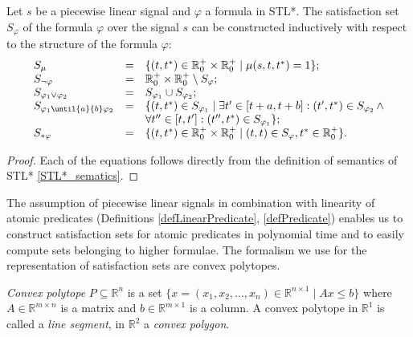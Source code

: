 \begin{theorem}
	\label{monitoring_STL*}
	Let $s$ be a piecewise linear signal and $\varphi$ a formula in STL*. The satisfaction set $S_\varphi$ of the formula $\varphi$ over the signal $s$ can be constructed inductively with respect to the structure of the formula $\varphi$:       
	\begin{equation*}
    	\begin{array}{lcl}
        	S_\mu & = & \lbrace (t, t^\ast) \in \mathbb{R}_0^+ \times \mathbb{R}_0^+ \mid \mu(s, t, t^\ast) = 1 \rbrace;\\
    		S_{\neg \varphi} & = & \mathbb{R}_0^+ \times \mathbb{R}_0^+ \setminus S_\varphi;\\ 
    		S_{\varphi_1 \vee \varphi_2} & = & S_{\varphi_1} \cup S_{\varphi_2};\\
			S_{\varphi_1 \until{a}{b} \varphi_2} & = & \lbrace (t, t^\ast) \in S_{\varphi_1} \mid \exists t' \in [t + a, t + b]: (t', t^\ast) \in S_{\varphi_2} \, \wedge\\
			& & \forall t'' \in [t, t'] : (t'', t^\ast) \in S_{\varphi_1}\rbrace;\\
			S_{\ast \varphi} & = & \lbrace (t, t^\ast) \in \mathbb{R}_0^+ \times \mathbb{R}_0^+ \mid (t, t) \in S_{\varphi}, t^\ast \in \mathbb{R}_0^+ \rbrace.\\ 
		\end{array}
	\end{equation*}

	\begin{proof}
		Each of the equations follows directly from the definition of semantics of STL* \eqref{STL*_sematics}.
	\end{proof}
\end{theorem}

The assumption of piecewise linear signals in combination with linearity of atomic predicates (Definitions \ref{defLinearPredicate}, \ref{defPredicate}) enables us to construct satisfaction sets for atomic predicates in polynomial time and to easily compute sets belonging to higher formulae. The formalism we use for the representation of satisfaction sets are convex polytopes.

\begin{definition}
	\label{defConvexPolytope}
	\emph{Convex polytope} $P \subseteq \mathbb{R}^n$ is a set $\lbrace x = (x_1, x_2, \ldots, x_n) \in \mathbb{R}^{n \times 1} \mid Ax \leq b \rbrace$ where $A \in \mathbb{R}^{m \times n}$ is a matrix and $b \in \mathbb{R}^{m \times 1}$ is a  column. A convex polytope in $\mathbb{R}^1$ is called a \emph{line segment}, in $\mathbb{R}^2$ a \emph{convex polygon}.
\end{definition}

